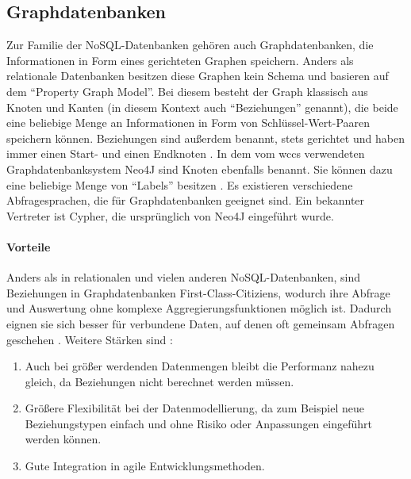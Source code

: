\subsection{Graphdatenbanken}
    Zur Familie der NoSQL-Datenbanken gehören auch Graphdatenbanken,
    die Informationen in Form eines gerichteten Graphen speichern.
    Anders als relationale Datenbanken besitzen diese Graphen kein Schema
    und basieren auf dem "`Property Graph Model"'.
    Bei diesem besteht der Graph klassisch aus Knoten und Kanten
    (in diesem Kontext auch "`Beziehungen"' genannt),
    die beide eine beliebige Menge an Informationen in Form
    von Schlüssel-Wert-Paaren speichern können.
    Beziehungen sind außerdem benannt, stets gerichtet und haben immer einen
    Start- und einen Endknoten
    \cite[Kapitel 1]{robinson:graphdatabases}.
    In dem vom \gls{wccs} verwendeten Graphdatenbanksystem Neo4J sind Knoten ebenfalls benannt.
    Sie können dazu eine beliebige Menge von "`Labels"' besitzen
    \cite[Kapitel 1.2.1.4]{neo4j:documentation}.
    Es existieren verschiedene Abfragesprachen, die für Graphdatenbanken geeignet sind.
    Ein bekannter Vertreter ist Cypher, die ursprünglich von Neo4J \cite[Kapitel 3]{neo4j:documentation} eingeführt wurde.

    \paragraph{Vorteile}
    Anders als in relationalen und vielen anderen NoSQL-Datenbanken,
    sind Beziehungen in Graphdatenbanken First-Class-Citiziens,
    wodurch ihre Abfrage und Auswertung ohne komplexe Aggregierungsfunktionen möglich ist.
    Dadurch eignen sie sich besser für verbundene Daten,
    auf denen oft gemeinsam Abfragen geschehen
    \cite[Kapitel 2]{robinson:graphdatabases}
    \cite[Kapitel 11.2]{sadalage:nosql}.
    Weitere Stärken sind
    \cite[Kapitel 1]{robinson:graphdatabases}
    \cite[Kapitel 11.1]{sadalage:nosql}:
    
    \begin{enumerate}
        \item   Auch bei größer werdenden Datenmengen bleibt die Performanz nahezu gleich,
                da Beziehungen nicht berechnet werden müssen.
        \item   Größere Flexibilität bei der Datenmodellierung, da zum Beispiel
                neue Beziehungstypen einfach und ohne Risiko oder Anpassungen eingeführt werden können.
        \item   Gute Integration in agile Entwicklungsmethoden.
    \end{enumerate}
    
